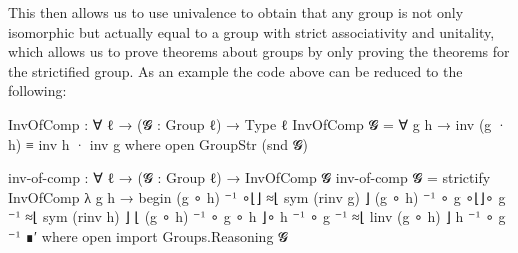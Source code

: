\documentclass{article}
\begin{document}
This then allows us to use univalence to obtain that any group is not only isomorphic but actually equal to a group with strict associativity and unitality, which allows us to prove theorems about groups by only proving the theorems for the strictified group. As an example the code above can be reduced to the following:
\begin{code}
InvOfComp : ∀ {ℓ} → (𝓖 : Group ℓ) → Type ℓ
InvOfComp 𝓖 = ∀ g h → inv (g · h) ≡ inv h · inv g
  where open GroupStr (snd 𝓖)

inv-of-comp : ∀ {ℓ} → (𝓖 : Group ℓ) → InvOfComp 𝓖
inv-of-comp 𝓖 = strictify InvOfComp
  λ g h → begin
    (g ∘ h) ⁻¹ ∘⌊⌋                      ≈⌊ sym (rinv g) ⌋
    (g ∘ h) ⁻¹ ∘ g ∘⌊⌋∘ g ⁻¹            ≈⌊ sym (rinv h) ⌋
    ⌊ (g ∘ h) ⁻¹ ∘ g ∘ h ⌋∘ h ⁻¹ ∘ g ⁻¹ ≈⌊ linv (g ∘ h) ⌋
    h ⁻¹ ∘ g ⁻¹                      ∎′
      where open import Groups.Reasoning 𝓖
\end{code}
\end{document}
